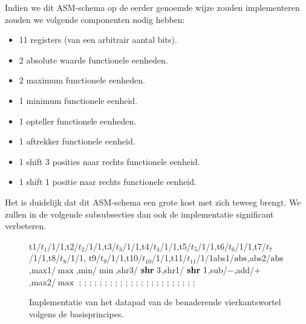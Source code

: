 Indien we dit ASM-schema op de eerder genoemde wijze zouden implementeren zouden we volgende componenten nodig hebben:
\begin{itemize}
 \item 11 registers (van een arbitrair aantal bits).
 \item 2 absolute waarde functionele eenheden.
 \item 2 maximum functionele eenheden.
 \item 1 minimum functionele eenheid.
 \item 1 opteller functionele eenheden.
 \item 1 aftrekker functionele eenheid.
 \item 1 shift 3 posities naar rechts functionele eenheid.
 \item 1 shift 1 positie naar rechts functionele eenheid.
\end{itemize}
Het is duidelijk dat dit ASM-schema een grote kost met zich teweeg brengt. We zullen in de volgende subsubsecties dan ook de implementatie significant verbeteren.
\begin{figure}[hbt]
\centering
\begin{sprocessor}[0.75/1.25/1.3/1.4/0.25/0.8]{t1/$t_1$/1/1,t2/$t_2$/1/1,t3/$t_3$/1/1,t4/$t_4$/1/1,t5/$t_5$/1/1,t6/$t_6$/1/1,t7/$t_7$/1/1,t8/$t_8$/1/1, t9/$t_9$/1/1,t10/$t_{10}$/1/1,t11/$t_{11}$/1/1}{abs1/$\operatorname{abs}$,abs2/$\operatorname{abs}$,max1/$\max$,min/$\min$,shr3/$\mbox{ \textbf{shr} }3$,shr1/$\mbox{ \textbf{shr} }1$,sub/$-$,add/$+$,max2/$\max$}{}
;
;
;
;
;
;
;
;
;
;
;
;
;
;
;
;
;
;
;
;
;
;
;
\end{sprocessor}
\caption{Implementatie van het datapad van de benaderende vierkantswortel volgens de basisprincipes.}
\end{figure}

